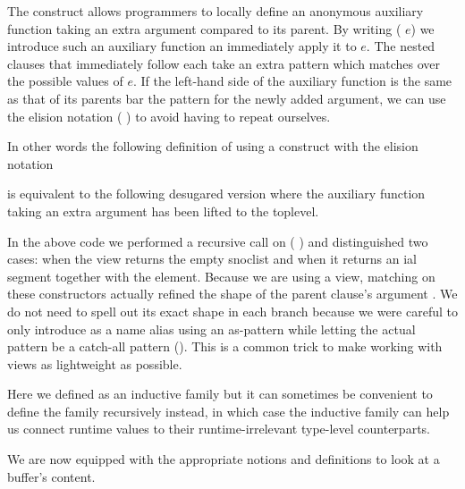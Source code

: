 \begin{remark}
  The  construct allows programmers to locally
  define an anonymous auxiliary function taking an extra argument
  compared to its parent.
  By writing ( \IdrisKeyword{(}$e$\IdrisKeyword{)})
  we introduce such an auxiliary function an immediately apply it to $e$.
  The nested clauses that immediately follow each take an extra pattern
  which matches over the possible values of $e$.
  If the left-hand side of the auxiliary function is the same as that of
  its parents bar the pattern for the newly added argument, we can use the
  elision notation (\IdrisKeyword{\_} \IdrisKeyword{|}) to avoid having to
  repeat ourselves.

  In other words the following definition of  using a
   construct with the elision notation


  \noindent is equivalent to the following desugared version where
  the auxiliary function taking an extra argument has been lifted
  to the toplevel.


\end{remark}

In the above code we performed a recursive call on
( ) and distinguished
two cases: when the view returns the empty snoclist \IdrisData{[<]}
and when it returns an ial segment together with the
 element.
%
Because we are using a view, matching on these constructors actually
refined the shape of the parent clause's argument .
We do not need to spell out its exact shape in each branch because
we were careful to only introduce  as a name alias
using an as-pattern while letting the actual pattern be a catch-all
pattern (\IdrisKeyword{\_}).
%
This is a common trick to make working with views as lightweight as
possible.

Here we defined  as an inductive family but it can
sometimes be convenient to define the family recursively instead,
in which case the  inductive family can
help us connect runtime values to their
runtime-irrelevant type-level counterparts.



We are now equipped with the appropriate notions and definitions to
look at a buffer's content.
